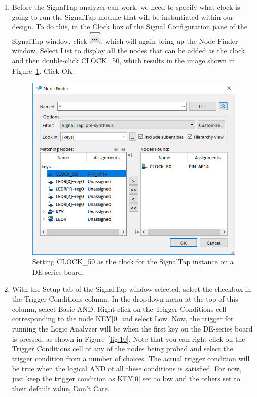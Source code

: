 \documentclass[11pt, twoside, pdftex]{article}
\begin{document}
\begin{enumerate}
\item Before the SignalTap analyzer can work, we need to specify what clock is going
to run the SignalTap module that will be instantiated within our design. To do this, in the Clock box of the
Signal Configuration pane of the SignalTap window, click \includegraphics[scale=0.7]{figures/icon5.png}, which will again bring up the Node Finder window.
Select {\sf List} to display all the nodes that can be added as the clock, and then double-click CLOCK\_50, which
results in the image shown in Figure~\ref{fig:9}. Click {\sf OK}.
  
\begin{figure}[H]
   \begin{center}
      \includegraphics[scale=0.6]{figures/figure9.png}
   \caption{Setting CLOCK\_50 as the clock for the SignalTap instance on a DE-series board.} 
	 \label{fig:9}
	 \end{center}
\end{figure}

\item With the {\sf Setup} tab of the SignalTap window selected, select the checkbox in the Trigger Conditions column. In the dropdown
menu at the top of this column, select {\sf Basic AND}. Right-click on the Trigger Conditions cell corresponding to the node 
KEY[0] and select {\sf Low}. Now, the trigger for running the Logic Analyzer will be when the first key on the DE-series board
is pressed, as shown in Figure~\ref{fig:10}.
Note that you can right-click on the Trigger Conditions cell of any of the nodes being probed and select the trigger
condition from a number of choices. The actual trigger condition will be true when the logical AND of all these
conditions is satisfied. For now, just keep the trigger condition as KEY[0] set to low and the others set to their default value, 
{\sf Don't Care}.
  

\end{enumerate}
\end{document}
